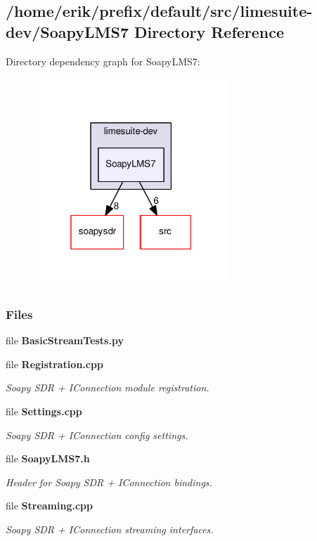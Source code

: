 \subsection{/home/erik/prefix/default/src/limesuite-\/dev/\+Soapy\+L\+M\+S7 Directory Reference}
\label{dir_23384e99d788a6686028dbf0bcd869f0}
Directory dependency graph for Soapy\+L\+M\+S7\+:
\nopagebreak
\begin{figure}[H]
\begin{center}
\leavevmode
\includegraphics[width=208pt]{dir_23384e99d788a6686028dbf0bcd869f0_dep}
\end{center}
\end{figure}
\subsubsection*{Files}
\begin{DoxyCompactItemize}
\item 
file {\bf Basic\+Stream\+Tests.\+py}
\item 
file {\bf Registration.\+cpp}
\begin{DoxyCompactList}\small\item\em Soapy S\+DR + I\+Connection module registration. \end{DoxyCompactList}\item 
file {\bf Settings.\+cpp}
\begin{DoxyCompactList}\small\item\em Soapy S\+DR + I\+Connection config settings. \end{DoxyCompactList}\item 
file {\bf Soapy\+L\+M\+S7.\+h}
\begin{DoxyCompactList}\small\item\em Header for Soapy S\+DR + I\+Connection bindings. \end{DoxyCompactList}\item 
file {\bf Streaming.\+cpp}
\begin{DoxyCompactList}\small\item\em Soapy S\+DR + I\+Connection streaming interfaces. \end{DoxyCompactList}\end{DoxyCompactItemize}

